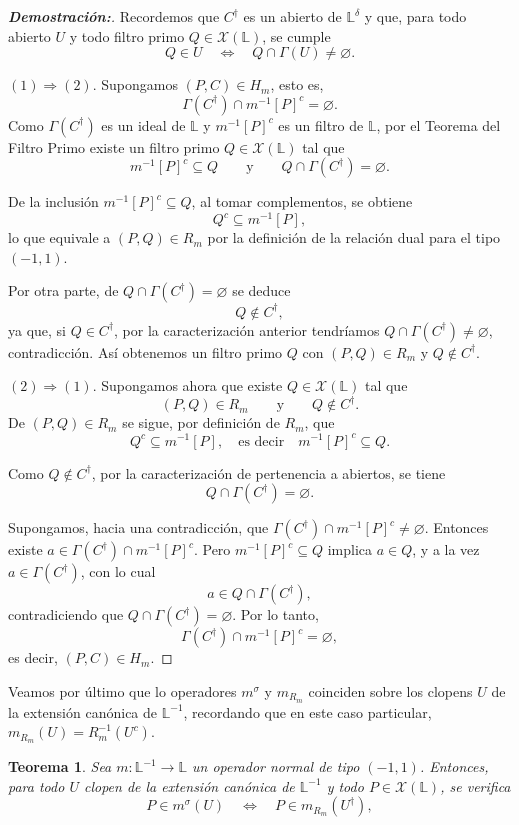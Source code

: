 \documentclass[12pt]{book}
\newtheorem{theorem}{Teorema}[section]
\begin{document}
\begin{proof}[\textbf{Demostración:}]
Recordemos que $C^{\dagger}$ es un abierto de $\mathbb{L}^\delta$
y que, para todo abierto $U$ y todo filtro primo $Q\in\mathcal X(\mathbb L)$,
se cumple
\[
Q\in U
\quad\Longleftrightarrow\quad
Q\cap\Gamma(U)\neq\varnothing.
\]

\medskip
\noindent
$(1)\Rightarrow(2)$.
Supongamos $(P,C)\in H_m$, esto es,
\[
\Gamma(C^{\dagger})\cap m^{-1}[P]^{c}=\varnothing.
\]
Como $\Gamma(C^{\dagger})$ es un ideal de $\mathbb L$ y $m^{-1}[P]^{c}$ es un
filtro de $\mathbb L$, por el Teorema del Filtro Primo existe un filtro
primo $Q\in\mathcal X(\mathbb L)$ tal que
\[
m^{-1}[P]^{c}\subseteq Q
\qquad\text{y}\qquad
Q\cap\Gamma(C^{\dagger})=\varnothing.
\]

De la inclusión $m^{-1}[P]^{c}\subseteq Q$, al tomar complementos, se obtiene
\[
Q^{c}\subseteq m^{-1}[P],
\]
lo que equivale a $(P,Q)\in R_m$ por la definición de la relación dual
para el tipo $(-1,1)$.

Por otra parte, de $Q\cap\Gamma(C^{\dagger})=\varnothing$ se deduce
\[
Q\notin C^{\dagger},
\]
ya que, si $Q\in C^{\dagger}$, por la caracterización anterior tendríamos
$Q\cap\Gamma(C^{\dagger})\neq\varnothing$, contradicción.  
Así obtenemos un filtro primo $Q$ con $(P,Q)\in R_m$ y $Q\notin C^{\dagger}$.

\medskip
\noindent
$(2)\Rightarrow(1)$.
Supongamos ahora que existe $Q\in\mathcal X(\mathbb L)$ tal que
\[
(P,Q)\in R_m
\qquad\text{y}\qquad
Q\notin C^{\dagger}.
\]
De $(P,Q)\in R_m$ se sigue, por definición de $R_m$, que
\[
Q^{c}\subseteq m^{-1}[P],
\quad\text{es decir}\quad
m^{-1}[P]^{c}\subseteq Q.
\]

Como $Q\notin C^{\dagger}$, por la caracterización de pertenencia a abiertos,
se tiene
\[
Q\cap\Gamma(C^{\dagger})=\varnothing.
\]

Supongamos, hacia una contradicción, que
\(\Gamma(C^{\dagger})\cap m^{-1}[P]^{c}\neq\varnothing\).
Entonces existe $a\in\Gamma(C^{\dagger})\cap m^{-1}[P]^{c}$.  
Pero $m^{-1}[P]^{c}\subseteq Q$ implica $a\in Q$, y a la vez
$a\in\Gamma(C^{\dagger})$, con lo cual
\[
a\in Q\cap\Gamma(C^{\dagger}),
\]
contradiciendo que $Q\cap\Gamma(C^{\dagger})=\varnothing$. Por lo tanto,
\[
\Gamma(C^{\dagger})\cap m^{-1}[P]^{c}=\varnothing,
\]
es decir, $(P,C)\in H_m$.
\end{proof}
Veamos por último que lo operadores $m^\sigma$ y $m_{R_m}$ coinciden sobre los clopens $U$ de la extensión canónica de $\mathbb{L}^{-1}$, recordando que en este caso particular, $m_{R_m}(U)=R_m^{-1}(U^c)$.
\begin{theorem}\label{teo:igualdad-operadores-estrella}
Sea $m:\mathbb L^{-1}\to\mathbb L$ un operador normal de tipo $(-1,1)$.
Entonces, para todo $U$ clopen de la extensión canónica de $\mathbb L^{-1}$ y todo
$P\in\mathcal X(\mathbb L)$, se verifica
\[
P\in m^\sigma(U)
\quad\Longleftrightarrow\quad
P\in m_{R_m}(U^{\dagger}),
\]
\end{theorem}
\end{document}
